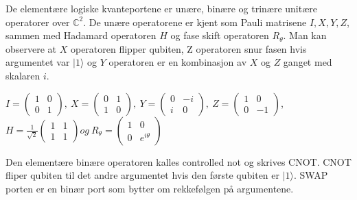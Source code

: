         De elementære logiske kvanteportene er unære, binære og trinære unitære operatorer over $\mathbb{C}^2$. De unære operatorene er kjent som Pauli matrisene $I, X, Y, Z$, sammen med Hadamard operatoren $H$ og fase skift operatoren $R_\theta$. Man kan observere at $X$ operatoren flipper qubiten, Z operatoren snur fasen hvis argumentet var $|1\rangle$ og $Y$ operatoren er en kombinasjon av $X$ og $Z$ ganget med skalaren $i$. 
        \begin{center}
            \begin{math}
                I = \begin{pmatrix}
                    1 & 0 \\ 0 & 1
                \end{pmatrix},\ X = \begin{pmatrix}
                    0 & 1 \\ 1 & 0
                \end{pmatrix},\ Y = \begin{pmatrix}
                    0 & -i \\ i & 0
                \end{pmatrix},\ Z = \begin{pmatrix}
                    1 & 0 \\ 0 & -1
                \end{pmatrix}
            \end{math},\\
            \begin{math}
                H = \frac{1}{\sqrt{2}}\begin{pmatrix}
                    1 & 1 \\ 1 & 1
                \end{pmatrix} og\ 
                R_\theta = \begin{pmatrix}
                    1 & 0 \\ 0 & e^{i\theta}
                \end{pmatrix}
            \end{math}
        \end{center}
        Den elementære binære operatoren kalles controlled not og skrives CNOT. CNOT fliper qubiten til det andre argumentet hvis den første qubiten er $|1\rangle$. SWAP porten er en binær port som bytter om rekkefølgen på argumentene.
